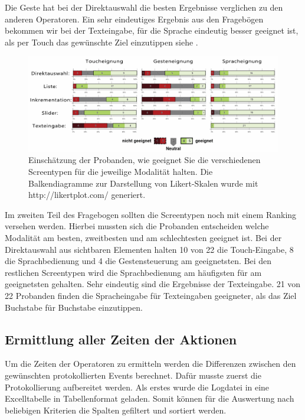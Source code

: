 Die Geste hat bei der Direktauswahl die besten Ergebnisse verglichen zu den anderen Operatoren. 
Ein sehr eindeutiges Ergebnis aus den Fragebögen bekommen wir bei der Texteingabe, für die Sprache eindeutig besser geeignet ist, als per Touch das gewünschte Ziel einzutippen siehe .
\begin{figure}[ht]
  \centering
  \includegraphics[width=1\textwidth]{img/Uebersicht_Eignung}
  \caption[Eignung des Screentypen]{Einschätzung der Probanden, wie geeignet Sie die verschiedenen Screentypen für die jeweilige Modalität halten. 
	Die Balkendiagramme zur Darstellung von Likert-Skalen wurde mit http://likertplot.com/ generiert.}
  \label{fig:Uebersicht_Eignung}
\end{figure}

Im zweiten Teil des Fragebogen sollten die Screentypen noch mit einem Ranking versehen werden. 
Hierbei mussten sich die Probanden entscheiden welche Modalität am besten, zweitbesten und am schlechtesten geeignet ist. 
Bei der Direktauswahl aus sichtbaren Elementen halten 10 von 22 die Touch-Eingabe, 8 die Sprachbedienung und 4 die Gestensteuerung am geeignetsten. 
Bei den restlichen Screentypen wird die Sprachbedienung am häufigsten für am geeignetsten gehalten. 
Sehr eindeutig sind die Ergebnisse der Texteingabe. 
21 von 22 Probanden finden die Spracheingabe für Texteingaben geeigneter, als das Ziel Buchstabe für Buchstabe einzutippen.

\subsection[Ermittlung der Zeiten der Aktionen]{Ermittlung aller Zeiten der Aktionen}
Um die Zeiten der Operatoren zu ermitteln werden die Differenzen zwischen den gewünschten protokollierten Events berechnet. 
Dafür musste zuerst die Protokollierung aufbereitet werden. 
Als erstes wurde die Logdatei in eine Excelltabelle in Tabellenformat geladen. 
Somit können für die Auswertung nach beliebigen Kriterien die Spalten gefiltert und sortiert werden. 

